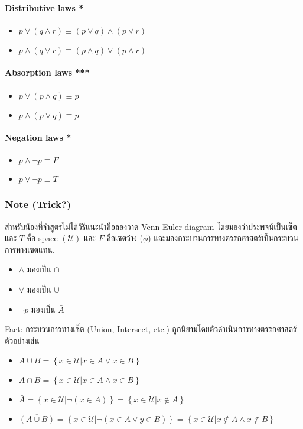 \documentclass[12pt,a4paper]{article}
\begin{document}
\paragraph{Distributive laws *}
\begin{itemize}
    \item $p \lor (q \land r) \equiv (p \lor q) \land (p \lor r)$
    \item $p \land (q \lor r) \equiv (p \land q) \lor (p \land r)$
\end{itemize}

\paragraph{Absorption laws ***}
\begin{itemize}
    \item $p \lor (p \land q) \equiv p$
    \item $p \land (p \lor q) \equiv p$
\end{itemize}
\paragraph{Negation laws *}
\begin{itemize}
    \item $p \land \neg p \equiv F$
    \item $p \lor \neg p \equiv T$
\end{itemize}

\subsubsection*{Note (Trick?)}
สำหรับน้องที่จำสูตรไม่ได้วิธีแนะนำคือลองวาด Venn-Euler diagram โดยมองว่าประพจน์เป็นเซ็ต และ $T$ คือ space $\left( \mathcal{U} \right)$ และ $F$ คือเซตว่าง ($\phi$) และมองกระบวนการทางตรรกศาสตร์เป็นกระบวนการทางเซตแทน. \\
\begin{itemize}
    \item $\land$ มองเป็น $\cap$
    \item $\lor$ มองเป็น $\cup$
    \item $\neg p$ มองเป็น $\bar{A}$
\end{itemize}


\rule{0pt}{4ex}
Fact: กระบวนการทางเซ็ต (Union, Intersect, etc.) ถูกนิยามโดยตัวดำเนินการทางตรรกศาสตร์
ตัวอย่างเช่น
\begin{itemize}
    \item $A \cup B = \left\{x \in \mathcal{U} \lvert x \in A \lor x\in B \right\}$
    \item $A \cap B = \left\{x \in \mathcal{U} \lvert x \in A \land x\in B \right\}$
    \item $\bar{A} = \left\{x \in \mathcal{U} \lvert \neg( x \in A) \right\} = \left\{x \in \mathcal{U}| x \not\in A\right\}$
    \item $\overline{(A \cup B)} = \left\{ x \in \mathcal{U} \lvert \neg(x\in A \lor y\in B) \right\} = \left\{ x \in \mathcal{U} \lvert x\not\in A \land x\not\in B \right\}$
\end{itemize}
\hrulefill
\newpage
\end{document}
